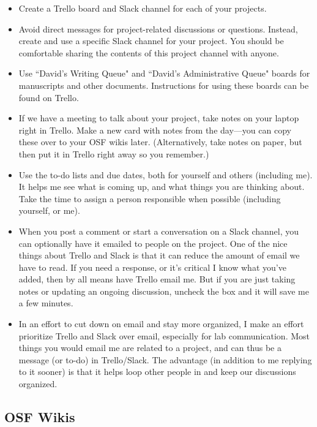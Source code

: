 \documentclass[letterpaper,12pt,oneside]{memoir}
\begin{document}
\begin{itemize}
\item Create a Trello board and Slack channel for each of your projects.

\item Avoid direct messages for project-related discussions or questions. Instead, create and use a specific Slack channel for your project. You should be comfortable sharing the contents of this project channel with anyone.

\item Use ``David's Writing Queue" and ``David's Administrative Queue" boards for manuscripts and other documents. Instructions for using these boards can be found on Trello.

\item If we have a meeting to talk about your project, take notes on your laptop right in Trello. Make a new card with notes from the day---you can copy these over to your OSF wikis later. (Alternatively, take notes on paper, but then put it in Trello right away so you remember.)

\item Use the to-do lists and due dates, both for yourself and others (including me). It helps me see what is coming up, and what things you are thinking about. Take the time to assign a person responsible when possible (including yourself, or me).

\item When you post a comment or start a conversation on a Slack channel, you can optionally have it emailed to people on the project. One of the nice things about Trello and Slack is that it can reduce the amount of email we have to read. If you need a response, or it's critical I know what you've added, then by all means have Trello email me. But if you are just taking notes or updating an ongoing discussion, uncheck the box and it will save me a few minutes.

\item In an effort to cut down on email and stay more organized, I make an effort prioritize Trello and Slack over email, especially for lab communication. Most things you would email me are related to a project, and can thus be a message (or to-do) in Trello/Slack. The advantage (in addition to me replying to it sooner) is that it helps loop other people in and keep our discussions organized. 

\end{itemize}


\subsection{OSF Wikis}
\end{document}
